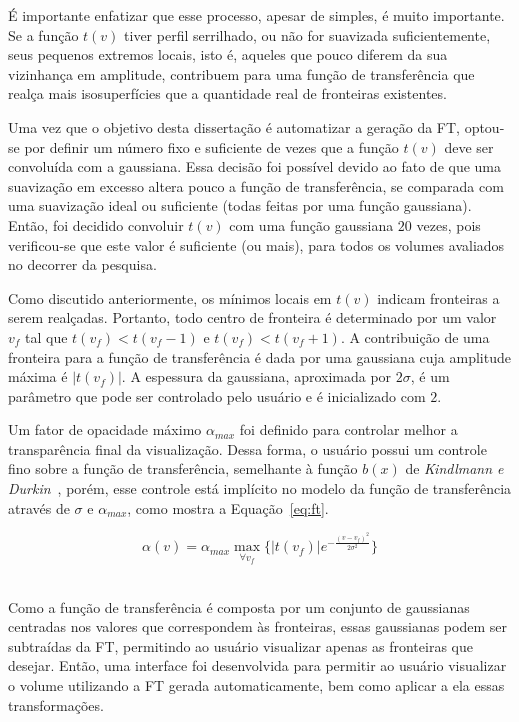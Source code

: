 	É importante enfatizar que esse processo, apesar de simples, é muito importante. Se a função $ t(v) $ tiver perfil serrilhado, ou não for suavizada suficientemente, seus pequenos extremos locais, isto é, aqueles que pouco diferem da sua vizinhança em amplitude, contribuem para uma função de transferência que realça mais isosuperfícies que a quantidade real de fronteiras existentes.

	Uma vez que o objetivo desta dissertação é automatizar a geração da FT, optou-se por definir um número fixo e suficiente de vezes que a função $ t(v) $ deve ser convoluída com a gaussiana. Essa decisão foi possível devido ao fato de que uma suavização em excesso altera pouco a função de transferência, se comparada com uma suavização ideal ou suficiente (todas feitas por uma função gaussiana). Então, foi decidido convoluir $ t(v) $ com uma função gaussiana $ 20 $ vezes, pois verificou-se que este valor é suficiente (ou mais), para todos os volumes avaliados no decorrer da pesquisa.
	
	Como discutido anteriormente, os mínimos locais em $ t(v) $ indicam fronteiras a serem realçadas. Portanto, todo centro de fronteira é determinado por um valor $ v_{f} $ tal que $t(v_{f}) < t(v_{f} - 1)$ e $ t(v_{f}) < t(v_{f} + 1)$. A contribuição de uma fronteira para a função de transferência é dada por uma gaussiana cuja amplitude máxima é $ |t(v_{f})| $. A espessura da gaussiana, aproximada por $ 2\sigma $, é um parâmetro que pode ser controlado pelo usuário e é inicializado com $ 2 $.
	
	Um fator de opacidade máximo $ \alpha_{max} $ foi definido para controlar melhor a transparência final da visualização. Dessa forma, o usuário possui um controle fino sobre a função de transferência, semelhante à função $ b(x) $ de \textit{Kindlmann e Durkin}~\cite{gordon}, porém, esse controle está implícito no modelo da função de transferência através de $ \sigma $ e $ \alpha_{max} $, como mostra a Equação~\eqref{eq:ft}.

\begin{equation} \label{eq:ft}
	\alpha(v) = \alpha_{max}\max_{\forall v_{f}}\big\{|t(v_{f})|e^{-\frac{(v-v_{f})^{2}}{2\sigma^{2}}}\big\}
\end{equation}\

	Como a função de transferência é composta por um conjunto de gaussianas centradas nos valores que correspondem às fronteiras, essas gaussianas podem ser subtraídas da FT, permitindo ao usuário visualizar apenas as fronteiras que desejar. Então, uma interface foi desenvolvida para permitir ao usuário visualizar o volume utilizando a FT gerada automaticamente, bem como aplicar a ela essas transformações.
	
